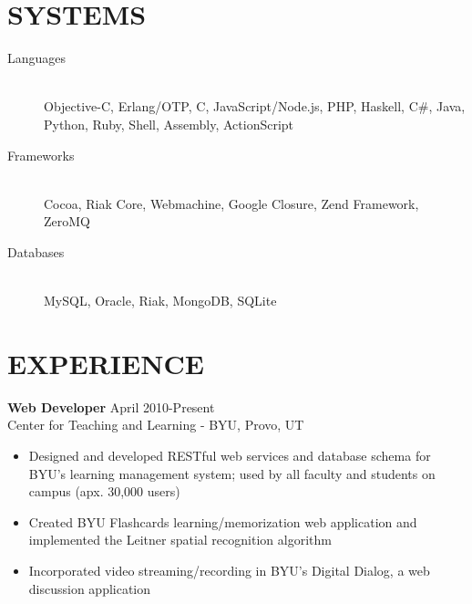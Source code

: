 \documentclass[margin]{res}
\begin{document}
 


  \address{\bf  377 N 750 E\\Provo, UT 84606\\(801) 803-8577}
  \address{bytheway.cameron@gmail.com\\LinkedIn: Cameron Bytheway}

  \begin{resume}

    \section{SYSTEMS}
      \begin{description}
        \item[Languages] \hfill \\
        Objective-C, Erlang/OTP, C, JavaScript/Node.js, PHP, Haskell,
        C\#, Java, Python, Ruby, Shell, Assembly, ActionScript
        \item[Frameworks] \hfill \\
        Cocoa, Riak Core, Webmachine, Google Closure, Zend Framework, ZeroMQ
        \item[Databases] \hfill \\
        MySQL, Oracle, Riak, MongoDB, SQLite
      \end{description}

    \section{EXPERIENCE}
      {\bf Web Developer} \hfill April 2010-Present \\
      Center for Teaching and Learning - BYU, Provo, UT
      \begin{itemize} \itemsep -2pt
        \item Designed and developed RESTful web services and database
         schema for BYU's learning management system; used by all 
         faculty and students on campus (apx. 30,000 users)
        \item Created BYU Flashcards learning/memorization web 
        application and implemented the Leitner spatial recognition 
        algorithm
        \item Incorporated video streaming/recording in BYU's Digital 
        Dialog, a web discussion application
      \end{itemize}


\end{resume}
\end{document}
